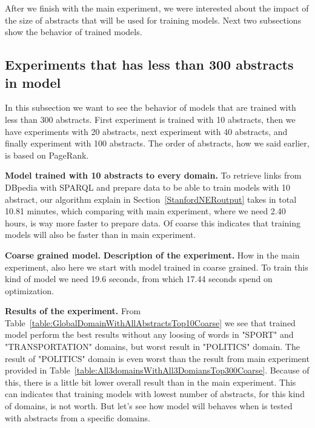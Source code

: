 \documentclass[thesis=M,english]{FITthesis}[2018/05/30]
\begin{document}
	After we finish with the main experiment, we were interested about the impact of the size of abstracts that will be used for training models. Next two subsections show the behavior of trained models.     
\subsection{Experiments that has less than 300 abstracts in model}\label{LessThan300Abstracts}
	In this subsection we want to see the behavior of models that are trained with less than 300 abstracts. First experiment is trained with 10 abstracts, then we have experiments with 20 abstracts, next experiment with 40 abstracts, and finally experiment with 100 abstracts. The order of abstracts, how we said earlier, is based on PageRank.
	
	\textbf{Model trained with 10 abstracts to every domain.} To retrieve links from DBpedia with SPARQL and prepare data to be able to train models with 10 abstract, our algorithm explain in Section~\ref{StanfordNERoutput} takes in total 10.81 minutes, which comparing with main experiment, where we need 2.40 hours, is way more faster to prepare data. Of coarse this indicates that training models will also be faster than in main experiment.
	
	\textbf{Coarse grained model.} 
	\textbf{Description of the experiment.} How in the main experiment, also here we start with model trained in coarse grained. To train this kind of model we need 19.6 seconds, from which 17.44 seconds spend on optimization. 
	
	\textbf{Results of the experiment.} From Table~\ref{table:GlobalDomainWithAllAbstractsTop10Coarse} we see that trained model perform the best results without any loosing of words in "SPORT" and "TRANSPORTATION" domains, but worst result in "POLITICS" domain. The result of "POLITICS" domain is even worst than the result from main experiment provided in Table~\ref{table:All3domainsWithAll3DomiansTop300Coarse}. Because of this, there is a little bit lower overall result than in the main experiment. This can indicates that training models with lowest number of abstracts, for this kind of domains, is not worth. But let's see how model will behaves when is tested with abstracts from a specific domains.
	
\end{document}
